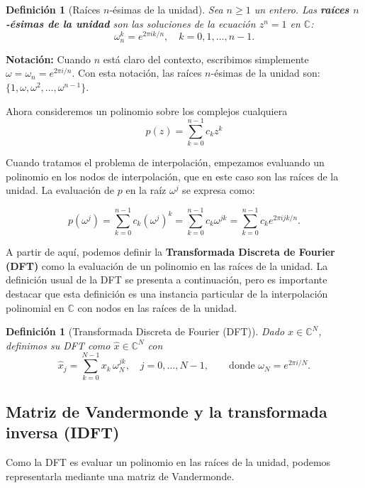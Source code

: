 \documentclass[a4paper,11pt]{report}
\newtheorem{definition}[theorem]{Definición}
\begin{document}
\begin{definition}[Raíces $n$-ésimas de la unidad]
Sea $n \geq 1$ un entero. Las \textbf{raíces $n$-ésimas de la unidad} son las soluciones de la ecuación $z^n = 1$ en $\mathbb{C}$:
\[
\omega_n^k = e^{2\pi i k / n}, \quad k = 0, 1, \ldots, n-1.
\]
\end{definition}
\textbf{Notación:} Cuando $n$ está claro del contexto, escribimos simplemente $\omega = \omega_n = e^{2\pi i/n}$. Con esta notación, las raíces $n$-ésimas de la unidad son: $\{1, \omega, \omega^2, \ldots, \omega^{n-1}\}$.

Ahora consideremos un polinomio sobre los complejos cualquiera 
\begin{equation} 
    p(z) = \sum_{k=0}^{n-1} c_k z^k
\end{equation} 

Cuando tratamos el problema de interpolación, empezamos evaluando un polinomio en los nodos de interpolación, que en este caso son las raíces de la unidad. La evaluación de $p$ en la raíz $\omega^j$ se expresa como:

\begin{equation} 
p(\omega^j) = \sum_{k=0}^{n-1} c_k (\omega^j)^k = \sum_{k=0}^{n-1} c_k \omega^{jk} = \sum_{k=0}^{n-1} c_k e^{2\pi i jk / n}.
\end{equation} 

A partir de aquí, podemos definir la \textbf{Transformada Discreta de Fourier (DFT)} como la evaluación de un polinomio en las raíces de la unidad. La definición usual de la DFT se presenta a continuación, pero es importante destacar que esta definición es una instancia particular de la interpolación polinomial en $\mathbb{C}$ con nodos en las raíces de la unidad.

\begin{definition}[Transformada Discreta de Fourier (DFT)]
Dado $x \in \mathbb{C}^N$, definimos su DFT como $\hat{x} \in \mathbb{C}^N$ con
\[
\hat{x}_j = \sum_{k=0}^{N-1} x_k\, \omega_N^{jk}, \quad j = 0, \ldots, N-1, \qquad \text{donde } \omega_N = e^{2\pi i/N}.
\]    
\end{definition}

\subsection{Matriz de Vandermonde y la transformada inversa (IDFT)}

Como la DFT es evaluar un polinomio en las raíces de la unidad, podemos representarla mediante una matriz de Vandermonde.
\end{document}
